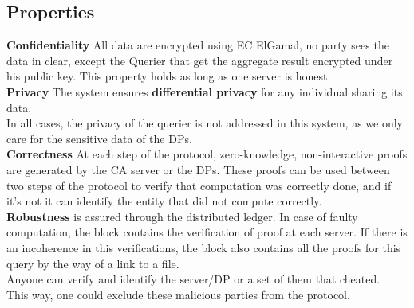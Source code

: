 \documentclass{article}
\begin{document}
\subsection{Properties}
\textbf{Confidentiality} All data are encrypted using EC ElGamal, no party sees the data in clear, except the Querier that get the aggregate result encrypted under his public key. This property holds as long as one server is honest.\\
\textbf{Privacy} The system ensures \textbf{differential privacy} for any individual sharing its data.\\
In all cases, the privacy of the querier is not addressed in this system, as we only care for the sensitive data of the DPs.\\
\textbf{Correctness} At each step of the protocol, zero-knowledge, non-interactive proofs are generated by the CA server or the DPs. These proofs can be used between two steps of the protocol to verify that computation was correctly done, and if it's not it can identify the entity that did not compute correctly.\\
\textbf{Robustness} is assured through the distributed ledger. In case of faulty computation, the block contains the verification of proof at each server.
If there is an incoherence in this verifications, the block also contains all the proofs for this query by the way of a link to a file.\\
Anyone can verify and identify the server/DP or a set of them that cheated.\\
This way, one could exclude these malicious parties from the protocol.
\end{document}
